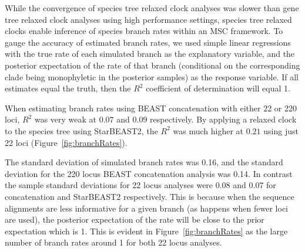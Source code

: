 \documentclass[12pt]{article}
\begin{document}
While the convergence of species tree relaxed clock analyses was slower than
gene tree relaxed clock analyses using high performance settings, species tree
relaxed clocks enable inference of species branch rates within an MSC framework.
To gauge the accuracy of estimated branch rates, we used simple linear
regressions with the true rate of each simulated branch as the explanatory
variable, and the posterior expectation of the rate of that branch (conditional
on the corresponding clade being monophyletic in the posterior samples) as the
response variable. If all estimates equal the truth, then the $R^2$ coefficient
of determination will equal 1.

When estimating branch rates using BEAST concatenation with either 22 or 220 loci,
$R^2$ was very weak at $0.07$ and $0.09$ respectively. By applying a relaxed
clock to the species tree using StarBEAST2, the $R^2$ was much higher at $0.21$
using just 22 loci (Figure~\ref{fig:branchRates}).

The standard deviation of simulated branch rates was 0.16, and the standard
deviation for the 220 locus BEAST concatenation analysis was 0.14. In contrast the
sample standard deviations for 22 locus analyses were 0.08 and 0.07 for
concatenation and StarBEAST2 respectively. This is because when the sequence
alignments are less informative for a given branch (as happens when fewer loci are
used), the posterior expectation of the rate will be close to the prior
expectation which is 1. This is evident in Figure~\ref{fig:branchRates} as the
large number of branch rates around 1 for both 22 locus analyses.
\end{document}
